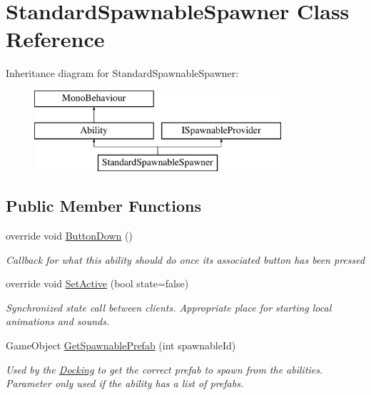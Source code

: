 \hypertarget{class_standard_spawnable_spawner}{}\section{Standard\+Spawnable\+Spawner Class Reference}
\label{class_standard_spawnable_spawner}
Inheritance diagram for Standard\+Spawnable\+Spawner\+:\begin{figure}[H]
\begin{center}
\leavevmode
\includegraphics[height=3.000000cm]{class_standard_spawnable_spawner}
\end{center}
\end{figure}
\subsection*{Public Member Functions}
\begin{DoxyCompactItemize}
\item 
override void \hyperlink{class_standard_spawnable_spawner_a1762d2f6a8bf3264b7316462648729a1}{Button\+Down} ()
\begin{DoxyCompactList}\small\item\em Callback for what this ability should do once its associated button has been pressed \end{DoxyCompactList}\item 
override void \hyperlink{class_standard_spawnable_spawner_a1c26d78c619871c3edb8d3febeb16e5f}{Set\+Active} (bool state=false)
\begin{DoxyCompactList}\small\item\em Synchronized state call between clients. Appropriate place for starting local animations and sounds. \end{DoxyCompactList}\item 
Game\+Object \hyperlink{class_standard_spawnable_spawner_afaadd0fd0cb2d16b40f979249747e9b1}{Get\+Spawnable\+Prefab} (int spawnable\+Id)
\begin{DoxyCompactList}\small\item\em Used by the \hyperlink{class_docking}{Docking} to get the correct prefab to spawn from the abilities. Parameter only used if the ability has a list of prefabs. \end{DoxyCompactList}\end{DoxyCompactItemize}
